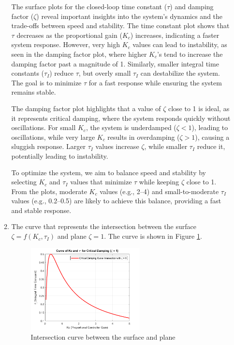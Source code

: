 \documentclass[12pt]{article}
\begin{document}
\begin{enumerate}
\begin{enumerate}
    The surface plots for the closed-loop time constant (\(\tau\)) and damping factor (\(\zeta\)) reveal important insights into the system's dynamics and the trade-offs between speed and stability. The time constant plot shows that \(\tau\) decreases as the proportional gain (\(K_c\)) increases, indicating a faster system response. However, very high \(K_c\) values can lead to instability, as seen in the damping factor plot, where higher $K_c$'s tend to increase the damping factor past a magnitude of 1. Similarly, smaller integral time constants (\(\tau_I\)) reduce \(\tau\), but overly small \(\tau_I\) can destabilize the system. The goal is to minimize \(\tau\) for a fast response while ensuring the system remains stable.

    The damping factor plot highlights that a value of \(\zeta\) close to 1 is ideal, as it represents critical damping, where the system responds quickly without oscillations. For small \(K_c\), the system is underdamped (\(\zeta < 1\)), leading to oscillations, while very large \(K_c\) results in overdamping (\(\zeta > 1\)), causing a sluggish response. Larger \(\tau_I\) values increase \(\zeta\), while smaller \(\tau_I\) reduce it, potentially leading to instability.

    To optimize the system, we aim to balance speed and stability by selecting \(K_c\) and \(\tau_I\) values that minimize \(\tau\) while keeping \(\zeta\) close to 1. From the plots, moderate \(K_c\) values (e.g., 2–4) and small-to-moderate \(\tau_I\) values (e.g., 0.2–0.5) are likely to achieve this balance, providing a fast and stable response.

    \item
    The curve that represents the intersection between the surface $\zeta = f(K_c, \tau_I)$ and plane $\zeta = 1$. The curve is shown in Figure \ref{fig:figure1_11}.

    \begin{figure}[H]
      \centering
      \includegraphics[width=0.6\textwidth]{Figures/figure1_11.png}
      \caption{Intersection curve between the surface and plane}
      \label{fig:figure1_11}
    \end{figure}


\end{enumerate}
\end{enumerate}
\end{document}

